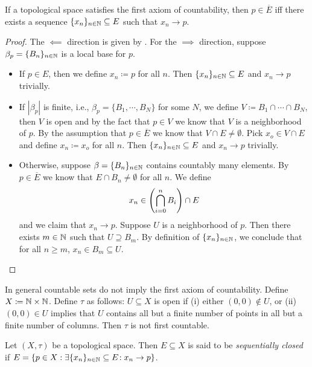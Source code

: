 \documentclass[screen]{techreport}
\numberwithin{equation}{section}
\begin{document}
\begin{lemma}\label{Lem:FirstCountLimitOfSeqIffClosure}
	If a topological space satisfies the first axiom of countability, then $p \in \overline{E}$ iff there exists a sequence $\{x_n\}_{n \in \mathbb{N}} \subseteq E$ such that $x_n \rightarrow p$.
\end{lemma}
\begin{proof}
	The ${\impliedby}$ direction is given by .
	For the ${\implies}$ direction, suppose $\beta_p = \{B_n\}_{n \in \mathbb{N}}$ is a local base for $p$.
	\begin{itemize}
		\item If $p \in E$, then we define $x_n \coloneqq p$ for all $n$.
		Then $\{x_n\}_{n \in \mathbb{N}} \subseteq E$ and $x_n \rightarrow p$ trivially.
		\item If $|\beta_p|$ is finite, i.e., $\beta_p = \{B_1,\cdots,B_N\}$ for some $N$, we define $V \coloneqq B_1 \cap \cdots \cap B_N$, then $V$ is open and by the fact that $p \in V$ we know that $V$ is a neighborhood of $p$.
			By the assumption that $p \in \overline{E}$ we know that $V \cap E \neq \emptyset$.
			Pick $x_o \in V \cap E$ and define $x_n \coloneqq x_o$ for all $n$.
			Then $\{x_n\}_{n \in \mathbb{N}} \subseteq E$ and $x_n \rightarrow p$ trivially.
		\item Otherwise, suppose $\beta=\{B_n\}_{n \in \mathbb{N}}$ contains countably many elements.
			By $p \in \overline{E}$ we know that $E \cap B_n \neq \emptyset$ for all $n$.
			We define
			\[
			x_n \in \left({ \bigcap_{i=0}^n B_i }\right) \cap E
			\]
			and we claim that $x_n \rightarrow p$.
			Suppose $U$ is a neighborhood of $p$.
			Then there exists $m \in \mathbb{N}$ such that $U \supseteq B_m$.
			By definition of $\{x_n\}_{n \in \mathbb{N}}$, we conclude that for all $n \ge m$, $x_n \in B_m \subseteq U$.
	\end{itemize}
\end{proof}

\begin{example}\label{Exa:CountableNotImplyFstCountable}
	In general countable sets do not imply the first axiom of countability.
	Define $X \coloneqq \mathbb{N} \times \mathbb{N}$.
	Define $\tau$ as follows: $U \subseteq X$ is open if (i) either $(0,0) \not\in U$, or (ii) $(0,0) \in U$ implies that $U$ contains all but a finite number of points in all but a finite number of columns.
	Then $\tau$ is not first countable.
\end{example}

\begin{definition}\label{De:SequentiallyClosed}
	Let $(X,\tau)$ be a topological space.
	Then $E \subseteq X$ is said to be \emph{sequentially closed} if $E = \{ p \in X : \exists {\{x_n\}_{n \in \mathbb{N}} \subseteq E }\!: x_n \rightarrow p \}$.
\end{definition}
\end{document}
